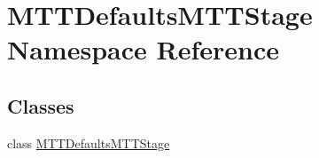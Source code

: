 \hypertarget{namespace_m_t_t_defaults_m_t_t_stage}{\section{M\-T\-T\-Defaults\-M\-T\-T\-Stage Namespace Reference}
\label{namespace_m_t_t_defaults_m_t_t_stage}
}
\subsection*{Classes}
\begin{DoxyCompactItemize}
\item 
class \hyperlink{class_m_t_t_defaults_m_t_t_stage_1_1_m_t_t_defaults_m_t_t_stage}{M\-T\-T\-Defaults\-M\-T\-T\-Stage}
\end{DoxyCompactItemize}
